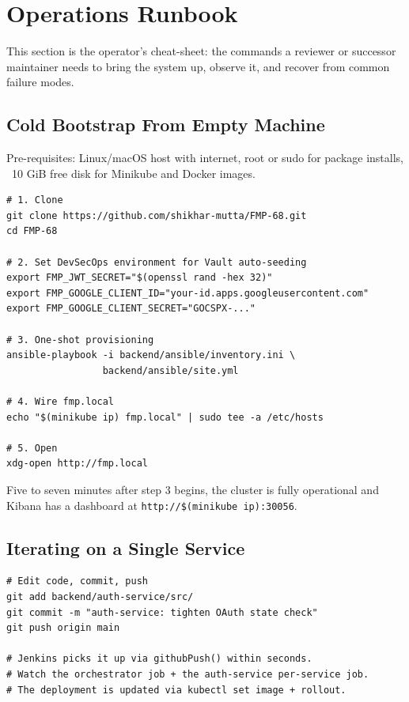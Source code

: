 \documentclass[11pt,a4paper]{article}
\begin{document}
\section{Operations Runbook}

This section is the operator's cheat-sheet: the commands a reviewer
or successor maintainer needs to bring the system up, observe it, and
recover from common failure modes.

\subsection{Cold Bootstrap From Empty Machine}
Pre-requisites: Linux/macOS host with internet, root or sudo for
package installs, ~10 GiB free disk for Minikube and Docker images.

\begin{lstlisting}
# 1. Clone
git clone https://github.com/shikhar-mutta/FMP-68.git
cd FMP-68

# 2. Set DevSecOps environment for Vault auto-seeding
export FMP_JWT_SECRET="$(openssl rand -hex 32)"
export FMP_GOOGLE_CLIENT_ID="your-id.apps.googleusercontent.com"
export FMP_GOOGLE_CLIENT_SECRET="GOCSPX-..."

# 3. One-shot provisioning
ansible-playbook -i backend/ansible/inventory.ini \
                 backend/ansible/site.yml

# 4. Wire fmp.local
echo "$(minikube ip) fmp.local" | sudo tee -a /etc/hosts

# 5. Open
xdg-open http://fmp.local
\end{lstlisting}

Five to seven minutes after step 3 begins, the cluster is fully
operational and Kibana has a dashboard at
\texttt{http://\$(minikube ip):30056}.

\subsection{Iterating on a Single Service}
\begin{lstlisting}
# Edit code, commit, push
git add backend/auth-service/src/
git commit -m "auth-service: tighten OAuth state check"
git push origin main

# Jenkins picks it up via githubPush() within seconds.
# Watch the orchestrator job + the auth-service per-service job.
# The deployment is updated via kubectl set image + rollout.
\end{lstlisting}
\end{document}
